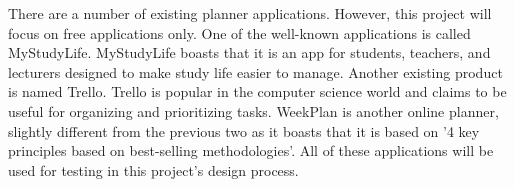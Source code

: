 %
% 

There are a number of existing planner applications. However, this project will focus on free applications only. One of the well-known applications is called MyStudyLife. MyStudyLife boasts that it is an app for students, teachers, and lecturers designed to make study life easier to manage. Another existing product is named Trello. Trello is popular in the computer science world and claims to be useful for organizing and prioritizing tasks. WeekPlan is another online planner, slightly different from the previous two as it boasts that it is based on '4 key principles based on best-selling methodologies'. All of these applications will be used for testing in this project's design process.

